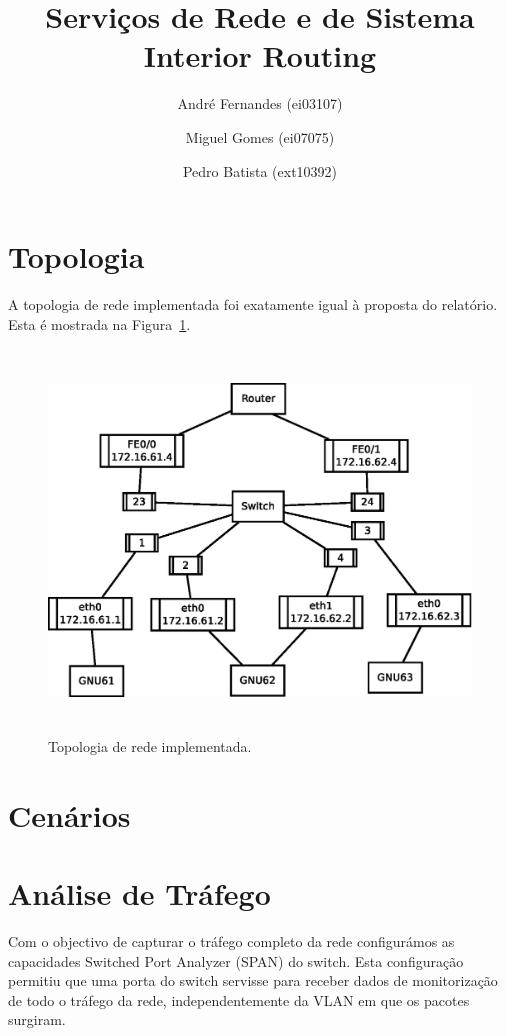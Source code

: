 \documentclass[a4paper,12pt]{article}
\title{Serviços de Rede e de Sistema \\
Interior Routing }
\author{André Fernandes (ei03107) \and Miguel Gomes (ei07075) \and Pedro Batista (ext10392)}
\begin{document}
\maketitle

\section{Topologia}
A topologia de rede implementada foi exatamente igual à proposta do relatório. Esta é mostrada na Figura~\ref{fig:topologia}.

\begin{figure}[htp]
	\begin{center}
		\includegraphics[height=4in]{topologia}
	\end{center}
	\caption{Topologia de rede implementada.}
	\label{fig:topologia}
\end{figure}

\section{Cenários}

\section{Análise de Tráfego}

	Com o objectivo de capturar o tráfego completo da rede configurámos as capacidades Switched Port Analyzer (SPAN) do switch. Esta configuração permitiu que uma porta do switch servisse para receber dados de monitorização de todo o tráfego da rede, independentemente da VLAN em que os pacotes surgiram.
\end{document}
